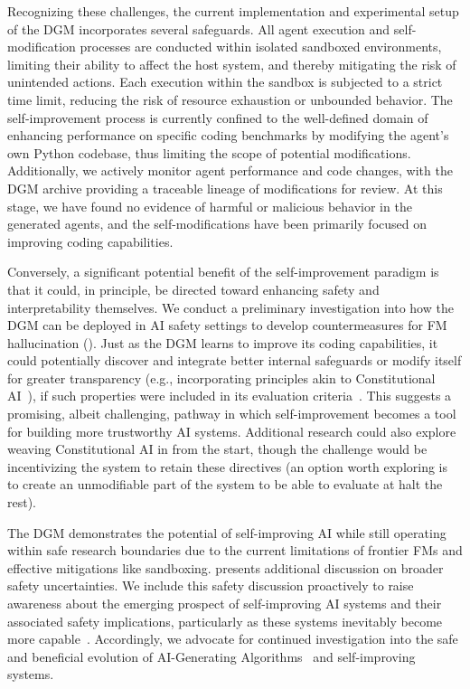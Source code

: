Recognizing these challenges, the current implementation and experimental setup of the DGM incorporates several safeguards. All agent execution and self-modification processes are conducted within isolated sandboxed environments, limiting their ability to affect the host system, and thereby mitigating the risk of unintended actions. Each execution within the sandbox is subjected to a strict time limit, reducing the risk of resource exhaustion or unbounded behavior. The self-improvement process is currently confined to the well-defined domain of enhancing performance on specific coding benchmarks by modifying the agent's own Python codebase, thus limiting the scope of potential modifications. Additionally, we actively monitor agent performance and code changes, with the DGM archive providing a traceable lineage of modifications for review. At this stage, we have found no evidence of harmful or malicious behavior in the generated agents, and the self-modifications have been primarily focused on improving coding capabilities.

Conversely, a significant potential benefit of the self-improvement paradigm is that it could, in principle, be directed toward enhancing safety and interpretability themselves. We conduct a preliminary investigation into how the DGM can be deployed in AI safety settings to develop countermeasures for FM hallucination (). Just as the DGM learns to improve its coding capabilities, it could potentially discover and integrate better internal safeguards or modify itself for greater transparency (e.g., incorporating principles akin to Constitutional AI~\citep{bai2022constitutional}), if such properties were included in its evaluation criteria~\citep{rosser2025agentbreeder}. This suggests a promising, albeit challenging, pathway in which self-improvement becomes a tool for building more trustworthy AI systems. Additional research could also explore weaving Constitutional AI in from the start, though the challenge would be incentivizing the system to retain these directives (an option worth exploring is to create an unmodifiable part of the system to be able to evaluate at halt the rest).

The DGM demonstrates the potential of self-improving AI while still operating within safe research boundaries due to the current limitations of frontier FMs and effective mitigations like sandboxing.  presents additional discussion on broader safety uncertainties. We include this safety discussion proactively to raise awareness about the emerging prospect of self-improving AI systems and their associated safety implications, particularly as these systems inevitably become more capable~\citep{yudkowsky2008artificial, bostrom2002a,ecoffet2020open, bengio2024managing,clune2019ai}. Accordingly, we advocate for continued investigation into the safe and beneficial evolution of AI-Generating Algorithms~\citep{clune2019ai} and self-improving systems.
